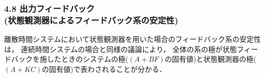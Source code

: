 
\begin{frame}[t]
\frametitle{4.8 出力フィードバック\\
(状態観測器によるフィードバック系の安定性)}
離散時間システムにおいて状態観測器を用いた場合のフィードバック系の安定性は，
連続時間システムの場合と同様の議論により，
全体の系の極が状態フィードバックを施したときのシステムの極($(A+BF)$の固有値)と状態観測器の極($(A + KC)$の固有値)で表わされることが分かる．
\end{frame}
